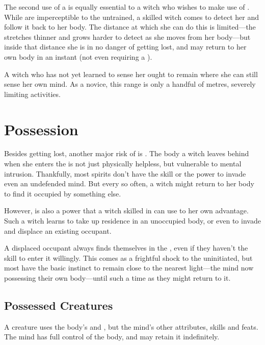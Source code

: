 The second use of a {\lifeline} is equally essential to a witch who wishes to make use of .
While {\lifelines} are imperceptible to the untrained, a skilled witch comes to detect her {\lifeline} and follow it back to her body.
The distance at which she can do this is limited---the {\lifeline} stretches thinner and grows harder to detect as she moves from her body---but inside that distance she is in no danger of getting lost, and may return to her own body in an instant (not even requiring a {\action}).

A witch who has not yet learned to sense her {\lifeline} ought to remain where she can still sense her own mind.
As a novice, this range is only a handful of metres, severely limiting activities.

\section{Possession}

Besides getting lost, another major risk of  is {\possession}.
The body a witch leaves behind when she enters the {\mentalrealm} is not just physically helpless, but vulnerable to mental intrusion.
Thankfully, most spirits don't have the skill or the power to invade even an undefended mind.
But every so often, a witch might return to her body to find it occupied by something else.

However, {\possession} is also a power that a witch skilled in  can use to her own advantage.
Such a witch learns to take up residence in an unoccupied body, or even to invade and displace an existing occupant.

A displaced occupant always finds themselves in the {\mentalrealm}, even if they haven't the skill to enter it willingly.
This comes as a frightful shock to the uninitiated, but most have the basic instinct to remain close to the nearest light---the mind now possessing their own body---until such a time as they might return to it.

\subsection{Possessed Creatures}

A {\possessed} creature uses the body's  and , but the {\possessing} mind's other attributes, skills and feats.
The {\possessing} mind has full control of the body, and may retain it indefinitely.

